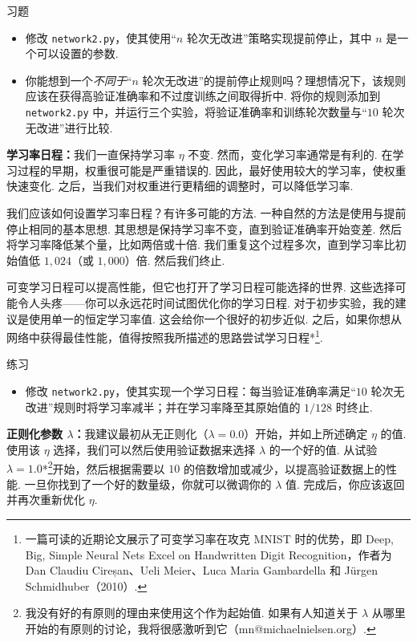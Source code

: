 \begin{exerciseBox}{习题}

\begin{itemize}

\item 修改 \texttt{network2.py}，使其使用“$n$ 轮次无改进”策略实现提前停止，其中 $n$ 是一个可以设置的参数.

\item 你能想到一个\emph{不同于}“$n$ 轮次无改进”的提前停止规则吗？理想情况下，该规则应该在获得高验证准确率和不过度训练之间取得折中. 将你的规则添加到 \texttt{network2.py} 中，并运行三个实验，将验证准确率和训练轮次数量与“$10$ 轮次无改进”进行比较.

\end{itemize}

\textbf{学习率日程：}我们一直保持学习率 $\eta$ 不变. 然而，变化学习率通常是有利的. 在学习过程的早期，权重很可能是严重错误的. 因此，最好使用较大的学习率，使权重快速变化. 之后，当我们对权重进行更精细的调整时，可以降低学习率.

我们应该如何设置学习率日程？有许多可能的方法. 一种自然的方法是使用与提前停止相同的基本思想. 其思想是保持学习率不变，直到验证准确率开始变差. 然后将学习率降低某个量，比如两倍或十倍. 我们重复这个过程多次，直到学习率比初始值低 $1,024$（或 $1,000$）倍. 然后我们终止.

可变学习日程可以提高性能，但它也打开了学习日程可能选择的世界. 这些选择可能令人头疼——你可以永远花时间试图优化你的学习日程. 对于初步实验，我的建议是使用单一的恒定学习率值. 这会给你一个很好的初步近似. 之后，如果你想从网络中获得最佳性能，值得按照我所描述的思路尝试学习日程*\footnote{一篇可读的近期论文展示了可变学习率在攻克 MNIST 时的优势，即 Deep, Big, Simple Neural Nets Excel on Handwritten Digit Recognition，作者为 Dan Claudiu Cireșan、Ueli Meier、Luca Maria Gambardella 和 Jürgen Schmidhuber（2010）.}.

\end{exerciseBox}

\begin{exerciseBox}{练习}

\begin{itemize}

\item 修改 \texttt{network2.py}，使其实现一个学习日程：每当验证准确率满足“$10$ 轮次无改进”规则时将学习率减半；并在学习率降至其原始值的 $1/128$ 时终止.

\end{itemize}

\textbf{正则化参数 $\lambda$：}我建议最初从无正则化（$\lambda = 0.0$）开始，并如上所述确定 $\eta$ 的值. 使用该 $\eta$ 选择，我们可以然后使用验证数据来选择 $\lambda$ 的一个好的值. 从试验 $\lambda = 1.0$*\footnote{我没有好的有原则的理由来使用这个作为起始值. 如果有人知道关于 $\lambda$ 从哪里开始的有原则的讨论，我将很感激听到它（mn@michaelnielsen.org）.}开始，然后根据需要以 $10$ 的倍数增加或减少，以提高验证数据上的性能. 一旦你找到了一个好的数量级，你就可以微调你的 $\lambda$ 值. 完成后，你应该返回并再次重新优化 $\eta$.

\end{exerciseBox}

